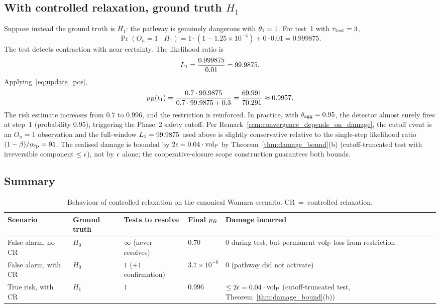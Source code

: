 \subsection{With controlled relaxation, ground truth $H_1$}

Suppose instead the ground truth is $H_1$: the pathway is
genuinely dangerous with $\theta_1 = 1$.  For test~1 with
$\tau_{\mathrm{test}} = 3$,
$$
\Pr(O_n = 1 \mid H_1)
   = 1 \cdot (1 - 1.25 \times 10^{-4})
     + 0 \cdot 0.01
   = 0.999875.
$$
The test detects contraction with near-certainty.  The
likelihood ratio is
$$
L_1 = \frac{0.999875}{0.01} = 99.9875.
$$
Applying~\eqref{eq:update_pos},
$$
p_R(t_1) = \frac{0.7 \cdot 99.9875}
                {0.7 \cdot 99.9875 + 0.3}
        = \frac{69.991}{70.291}
        \approx 0.9957.
$$
The risk estimate increases from $0.7$ to $0.996$, and the
restriction is reinforced.  In practice, with
$\delta_{\mathrm{agg}} = 0.95$, the detector almost surely fires at step~1
(probability $0.95$), triggering the Phase~2 safety cutoff.
Per Remark~\ref{rem:convergence_depends_on_damage}, the cutoff
event is an $O_n = 1$ observation and the full-window $L_1 =
99.9875$ used above is slightly conservative relative to the
single-step likelihood ratio $(1-\beta)/\alpha_{\mathrm{fp}} = 95$.  The
realised damage is bounded by $2 \epsilon = 0.04 \cdot
{\operatorname{vol}_{\mathrm{P}}}$ by Theorem~\ref{thm:damage_bound}(b) (cutoff-truncated
test with irreversible component $\leq \epsilon$), not by
$\epsilon$ alone; the cooperative-closure scope
construction guarantees both bounds.

\subsection{Summary}

\begin{table}[h]
\centering
\small
\begin{tabular}{@{}p{3.6cm}p{2.0cm}p{2.2cm}p{2.2cm}p{3.0cm}@{}}
\toprule
\textbf{Scenario} & \textbf{Ground truth} & \textbf{Tests to resolve} & \textbf{Final $p_R$} & \textbf{Damage incurred} \\
\midrule
False alarm, no CR
  & $H_0$
  & $\infty$ (never resolves)
  & $0.70$
  & $0$ during test, but permanent ${\operatorname{vol}_{\mathrm{P}}}$ loss from restriction \\
False alarm, with CR
  & $H_0$
  & $1$ ($+1$ confirmation)
  & $3.7 \times 10^{-8}$
  & $0$ (pathway did not activate) \\
True risk, with CR
  & $H_1$
  & $1$
  & $0.996$
  & $\leq 2\epsilon = 0.04 \cdot {\operatorname{vol}_{\mathrm{P}}}$ (cutoff-truncated
    test, Theorem~\ref{thm:damage_bound}(b)) \\
\bottomrule
\end{tabular}
\caption{Behaviour of controlled relaxation on the canonical
  Wamura scenario.  CR~=~controlled relaxation.}
\label{tab:worked_example}
\end{table}

